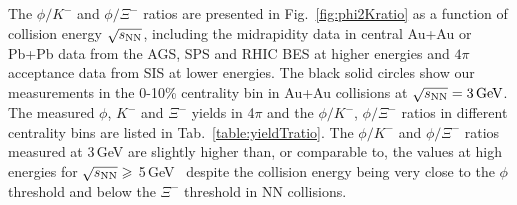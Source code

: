 \documentclass[aps,tightenlines,superscriptaddress,twocolumn]{revtex4-1}
\begin{document}
\begin{table}
\end{table}


The $\phi/K^-$ and $\phi/\Xi^-$ ratios are presented in Fig.~\ref{fig:phi2Kratio} as a function of collision energy $\sqrt{s_{\rm NN}}$, including the midrapidity data in central Au+Au or Pb+Pb data from the AGS, SPS and RHIC BES at higher energies and $4\pi$\,acceptance data from SIS at lower energies. The black solid circles show our measurements in the 0-10\% centrality bin in Au+Au collisions at ${\sqrt{s_{\rm NN}} = \rm{3\,GeV}}$. The measured $\phi$, $K^-$ and $\Xi^-$ yields in 4$\pi$ and the $\phi/K^-$, $\phi/\Xi^-$ ratios in different centrality bins are listed in Tab.~\ref{table:yieldTratio}. The $\phi/K^-$ and $\phi/\Xi^-$ ratios measured at 3\,GeV are slightly higher than, or comparable to, the values at high energies for $\sqrt{s_{\rm NN}} \geqslant$ 5\,GeV~\cite{NA49_piK2:2002,E917_phi:2004,NA49_phi:2008,NA49_piK:2008,NA49_Xi:2008,STAR_phi_64a200GeV:2009,Xi_ArKCl_HADES:2009,ALICE_phi_2p7TeV:2015,star_bes_strangeness:2020} despite the collision energy being very close to the $\phi$ threshold and below the $\Xi^-$ threshold in NN collisions. 
\end{document}
